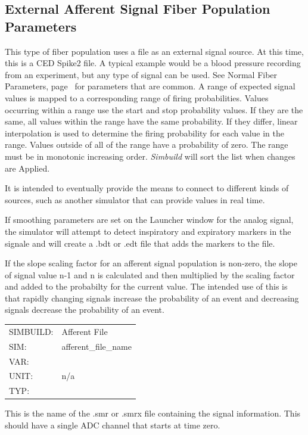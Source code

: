 \documentclass[12pt,openany,oneside]{book}
\newcommand{\tiref}[1]{#1, page~\pageref{#1}}
\newcommand{\prog}[1]{\textit{{#1}}}
\begin{document}
\subsection{External Afferent Signal Fiber Population Parameters}
\label{External Afferent Signal Population Parameters}
\noindent
This type of fiber population uses a file as an external signal source. At
this time, this is a CED Spike2 file. A typical example would be a blood
pressure recording from an experiment, but any type of signal can be used.
See \tiref{Normal Fiber Parameters} for parameters that are common.  A
range of expected signal values is mapped to a corresponding range of 
firing probabilities. Values occurring within a range use the start and
stop probability values. If they are the same, all values within the range
have the same probability. If they differ, linear interpolation is used to
determine the firing probability for each value in the range. Values
outside of all of the range have a probability of zero. The range must be
in monotonic increasing order. \prog{Simbuild} will sort the list when changes
are Applied.

It is intended to eventually provide the means to connect to different
kinds of sources, such as another simulator that can provide values in
real time.

If smoothing parameters are set on the Launcher window for the analog
signal, the simulator will attempt to detect inspiratory and expiratory
markers in the signale and will create a .bdt or .edt file that adds the
markers to the file.

If the slope scaling factor for an afferent signal population is non-zero,
the slope of signal value n-1 and n is calculated and then multiplied by
the scaling factor and added to the probabilty for the current value. The
intended use of this is that rapidly changing signals increase the
probability of an event and decreasing signals decrease the probability of
an event.

\begin{flushleft}
\begin{tabular}{@{}ll@{}}
SIMBUILD: & Afferent File\\
SIM: & afferent\_file\_name\\
VAR: &\\
UNIT: & n/a\\
TYP: &\\
\end{tabular}
\end{flushleft}
This is the name of the .smr or .smrx file containing the signal
information. This should have a single ADC channel that starts at time
zero.
\end{document}
